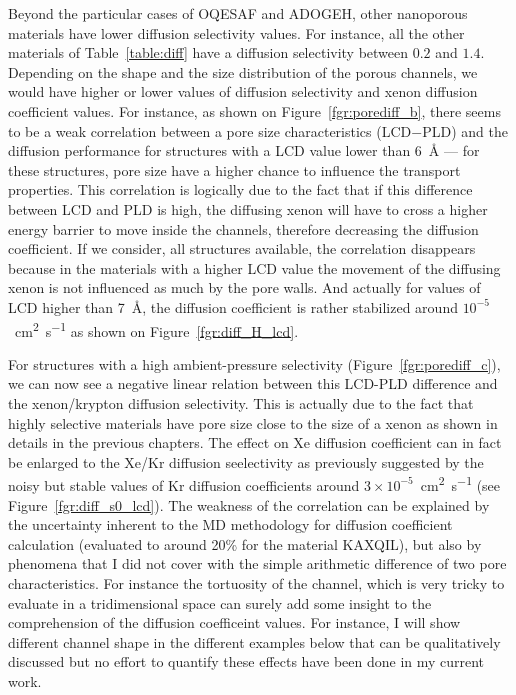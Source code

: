 \documentclass[main]{subfiles}
\begin{document}
Beyond the particular cases of OQESAF and ADOGEH, other nanoporous materials have lower diffusion selectivity values. For instance, all the other materials of Table~\ref{table:diff} have a diffusion selectivity between $0.2$ and $1.4$. Depending on the shape and the size distribution of the porous channels, we would have higher or lower values of diffusion selectivity and xenon diffusion coefficient values. For instance, as shown on Figure~\ref{fgr:porediff_b}, there seems to be a weak correlation between a pore size characteristics (LCD$-$PLD) and the diffusion performance for structures with a LCD value lower than \SI{6}{\angstrom} --- for these structures, pore size have a higher chance to influence the transport properties. This correlation is logically due to the fact that if this difference between LCD and PLD is high, the diffusing xenon will have to cross a higher energy barrier to move inside the channels, therefore decreasing the diffusion coefficient. If we consider, all structures available, the correlation disappears because in the materials with a higher LCD value the movement of the diffusing xenon is not influenced as much by the pore walls. And actually for values of LCD higher than \SI{7}{\angstrom}, the diffusion coefficient is rather stabilized around $10^{-5}$~\si{\square\cm\per\s} as shown on Figure~\ref{fgr:diff_H_lcd}. 

For structures with a high ambient-pressure selectivity (Figure~\ref{fgr:porediff_c}), we can now see a negative linear relation between this LCD-PLD difference and the xenon/krypton diffusion selectivity. This is actually due to the fact that highly selective materials have pore size close to the size of a xenon as shown in details in the previous chapters. The effect on Xe diffusion coefficient can in fact be enlarged to the Xe/Kr diffusion seelectivity as previously suggested by the noisy but stable values of Kr diffusion coefficients around $3\times10^{-5}$~\si{\square\cm\per\s} (see Figure~\ref{fgr:diff_s0_lcd}). The weakness of the correlation can be explained by the uncertainty inherent to the MD methodology for diffusion coefficient calculation (evaluated to around {20\%} for the material KAXQIL), but also by phenomena that I did not cover with the simple arithmetic difference of two pore characteristics. For instance the tortuosity of the channel, which is very tricky to evaluate in a tridimensional space can surely add some insight to the comprehension of the diffusion coefficeint values. For instance, I will show different channel shape in the different examples below that can be qualitatively discussed but no effort to quantify these effects have been done in my current work.
\end{document}
